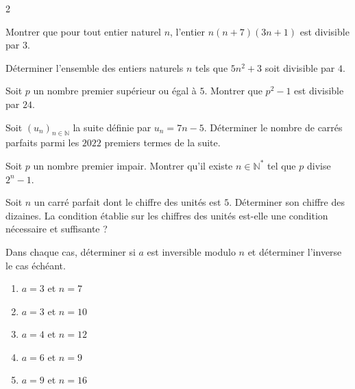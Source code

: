 \documentclass[a4paper,12pt]{article}
\begin{document}
\begin{multicols}{2}
    \begin{exercice}[title=Exercice 18 $\quad \star \quad$ { [Calculer, Raisonner] }]{}{}
    Montrer que pour tout entier naturel $n$, l’entier $n(n+7)(3n+1)$ est divisible par $3$.
    \end{exercice}
    
    \begin{exercice}[title=Exercice 19 $\quad \star \quad$ { [Calculer, Raisonner] }]{}{}
    Déterminer l’ensemble des entiers naturels $n$ tels que $5n^2 + 3$ soit divisible par $4$.
    \end{exercice}
    
    \begin{exercice}[title=Exercice 20 $\quad \star \star \quad$ { [Chercher, Raisonner] }]{}{}
    Soit $p$ un nombre premier supérieur ou égal à $5$. Montrer que $p^2 - 1$ est divisible par $24$.
    \end{exercice}
    
    \begin{exercice}[title=Exercice 21 $\quad \star \star \star \quad$ { [Chercher, Raisonner] }]{}{}
    Soit $(u_n)_{n \in \mathbb{N}}$ la suite définie par $u_n = 7n - 5$. Déterminer le nombre de carrés parfaits parmi les $2022$ premiers termes de la suite.
    \end{exercice}

\begin{exercice}[title=Exercice 22 $\quad \star \star \star \quad$ { [Chercher, Raisonner] }]{}{}
    Soit $p$ un nombre premier impair. Montrer qu’il existe $n \in \mathbb{N}^*$ tel que $p$ divise $2^n - 1$.
    \end{exercice}
    
    \begin{exercice}[title=Exercice 23 $\quad \star \star \quad$ { [Chercher, Raisonner] }]{}{}
    Soit $n$ un carré parfait dont le chiffre des unités est $5$. Déterminer son chiffre des dizaines. La condition établie sur les chiffres des unités est-elle une condition nécessaire et suffisante ?
    \end{exercice}
    
    \begin{exercice}[title=Exercice 24 $\quad \star \quad$ { [Calculer] }]{}{}
    Dans chaque cas, déterminer si $a$ est inversible modulo $n$ et déterminer l’inverse le cas échéant.
    \begin{enumerate}
        \item $a = 3$ et $n = 7$
        \item $a = 3$ et $n = 10$
        \item $a = 4$ et $n = 12$
        \item $a = 6$ et $n = 9$
        \item $a = 9$ et $n = 16$
    \end{enumerate}
    \end{exercice}
    

\end{multicols}
\end{document}
